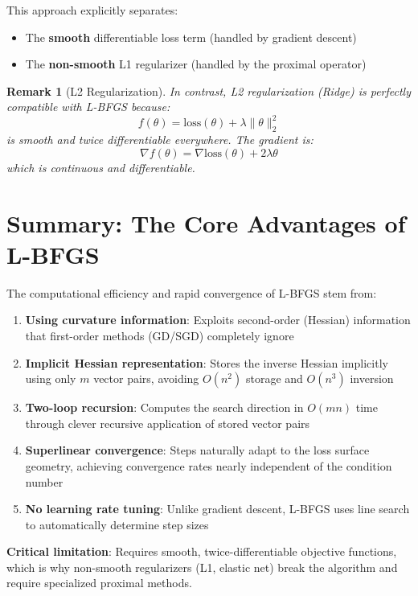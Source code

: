 \documentclass[11pt, a4paper, oneside]{article}
\newtheorem{remark}[theorem]{Remark}
\begin{document}
This approach explicitly separates:
\begin{itemize}
    \item The \textbf{smooth} differentiable loss term (handled by gradient descent)
    \item The \textbf{non-smooth} L1 regularizer (handled by the proximal operator)
\end{itemize}

\begin{remark}[L2 Regularization]
In contrast, L2 regularization (Ridge) is perfectly compatible with L-BFGS because:
\[
f(\theta) = \text{loss}(\theta) + \lambda \|\theta\|_2^2
\]
is smooth and twice differentiable everywhere. The gradient is:
\[
\nabla f(\theta) = \nabla \text{loss}(\theta) + 2\lambda \theta
\]
which is continuous and differentiable.
\end{remark}

\section{Summary: The Core Advantages of L-BFGS}

The computational efficiency and rapid convergence of L-BFGS stem from:

\begin{enumerate}
    \item \textbf{Using curvature information}: Exploits second-order (Hessian) information that first-order methods (GD/SGD) completely ignore
    
    \item \textbf{Implicit Hessian representation}: Stores the inverse Hessian implicitly using only $m$ vector pairs, avoiding $O(n^2)$ storage and $O(n^3)$ inversion
    
    \item \textbf{Two-loop recursion}: Computes the search direction in $O(mn)$ time through clever recursive application of stored vector pairs
    
    \item \textbf{Superlinear convergence}: Steps naturally adapt to the loss surface geometry, achieving convergence rates nearly independent of the condition number
    
    \item \textbf{No learning rate tuning}: Unlike gradient descent, L-BFGS uses line search to automatically determine step sizes
\end{enumerate}

\textbf{Critical limitation}: Requires smooth, twice-differentiable objective functions, which is why non-smooth regularizers (L1, elastic net) break the algorithm and require specialized proximal methods.
\end{document}
